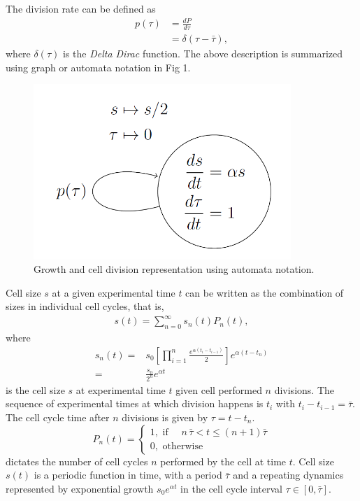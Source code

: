 \documentclass[
  letterpaper,
  DIV=11,
  numbers=noendperiod]{scrreprt}
\begin{document}
The division rate can be defined as \[\begin{aligned}
    p(\tau)&=\frac{d P}{d\tau}\\
    &=\delta(\tau-\bar{\tau}),
\end{aligned}\] where \(\delta(\tau)\) is the \emph{Delta Dirac}
function. The above description is summarized using graph or automata
notation in Fig 1.

\begin{figure}

{\centering \includegraphics[width=3.83333in,height=\textheight]{./hsys.png}

}

\caption{Growth and cell division representation using automata
notation.}

\end{figure}

Cell size \(s\) at a given experimental time \(t\) can be written as the
combination of sizes in individual cell cycles, that is,
\[\begin{aligned}
    s(t)=\sum_{n=0}^{\infty} s_n(t) P_n(t),
\end{aligned}\] where \[\begin{aligned}
    s_n(t)=&s_{0}\left[\prod_{i=1}^{n} \frac{e^{\alpha\left(t_{i}-t_{i-1}\right)}}{2}\right] e^{\alpha\left(t-t_{n}\right)}\\
    =&\frac{s_0}{2^n} e^{\alpha t}
\end{aligned}\] is the cell size \(s\) at experimental time \(t\) given
cell performed \(n\) divisions. The sequence of experimental times at
which division happens is \(t_i\) with \(t_i-t_{i-1}=\bar{\tau}\). The
cell cycle time after \(n\) divisions is given by \(\tau=t-t_n\).
\[P_n(t)=\begin{cases}
    1,  \text{ if }\quad n\,\bar{\tau} < t \leq (n+1)\bar{\tau}  \\
    0,  \text{ otherwise}
\end{cases}\] dictates the number of cell cycles \(n\) performed by the
cell at time \(t\). Cell size \(s(t)\) is a periodic function in time,
with a period \(\bar{\tau}\) and a repeating dynamics represented by
exponential growth \(s_0e^{\alpha t}\) in the cell cycle interval
\(\tau \in [0,\bar{\tau}]\).
\end{document}
